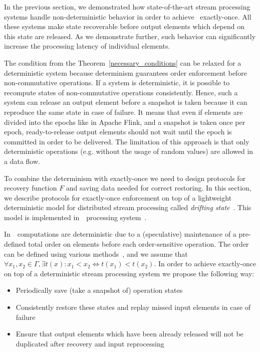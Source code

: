 
\label {fs-consistency-section}

In the previous section, we demonstrated how state-of-the-art stream processing systems handle non-deterministic behavior in order to achieve~ exactly-once. All these systems make state recoverable before output elements which depend on this state are released. As we demonstrate further, such behavior can significantly increase the processing latency of individual elements.

The condition from the Theorem~\ref{necessary_conditions} can be relaxed for a deterministic system because determinism guarantees order enforcement before non-commutative operations. If a system is deterministic, it is possible to recompute states of non-commutative operations consistently. Hence, such a system can release an output element before a snapshot is taken because it can reproduce the same state in case of failure. It means that even if elements are divided into the epochs like in Apache Flink, and a snapshot is taken once per epoch, ready-to-release output elements should not wait until the epoch is committed in order to be delivered. The limitation of this approach is that only deterministic operations (e.g. without the usage of random values) are allowed in a data flow.

To combine the determinism with  exactly-once we need to design protocols for recovery function $F$ and saving data needed for correct restoring. In this section, we describe protocols for exactly-once enforcement on top of a lightweight deterministic model for distributed stream processing called {\em drifting state}~\cite{we2018adbis}. This model is implemented in~\FlameStream\ processing system~\cite{we2018beyondmr}.

In~\FlameStream\, computations are deterministic due to a (speculative) maintenance of a pre-defined total order on elements before each order-sensitive operation. The order can be defined using various methods~\cite{we2018seim}, and we assume that $\forall x_1,x_2\in \Gamma, \exists t(x): x_1 < x_2 \Longleftrightarrow t(x_1) < t(x_2)$. In order to achieve exactly-once on top of a deterministic stream processing system we propose the following way:
\begin{itemize}
    \item Periodically save (take a snapshot of) operation states
    \item Consistently restore these states and replay missed input elements in case of failure
    \item Ensure that output elements which have been already released will not be duplicated after recovery and input reprocessing
\end{itemize}

